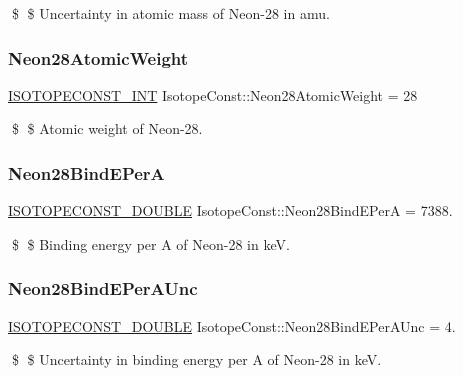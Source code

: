\$ \$ Uncertainty in atomic mass of Neon-\/28 in amu. \mbox{\label{group___isotope_const-_neon-_ne28_gaad970d7aacebccf54f007c617857c7b3}} 
\subsubsection{\texorpdfstring{Neon28\+Atomic\+Weight}{Neon28AtomicWeight}}
{\footnotesize\ttfamily \mbox{\hyperlink{group___isotope_const-_macros_ga5f18360b3e99483a35c32d789e62621c}{I\+S\+O\+T\+O\+P\+E\+C\+O\+N\+S\+T\+\_\+\+I\+NT}} Isotope\+Const\+::\+Neon28\+Atomic\+Weight = 28}

\$ \$ Atomic weight of Neon-\/28. \mbox{\label{group___isotope_const-_neon-_ne28_ga7e28fded1e84296d45d0d99a56a5345b}} 
\subsubsection{\texorpdfstring{Neon28\+Bind\+E\+PerA}{Neon28BindEPerA}}
{\footnotesize\ttfamily \mbox{\hyperlink{group___isotope_const-_macros_ga8f45a7272ce02c0b4c65c44636ed719a}{I\+S\+O\+T\+O\+P\+E\+C\+O\+N\+S\+T\+\_\+\+D\+O\+U\+B\+LE}} Isotope\+Const\+::\+Neon28\+Bind\+E\+PerA = 7388.}

\$ \$ Binding energy per A of Neon-\/28 in keV. \mbox{\label{group___isotope_const-_neon-_ne28_gac0edaf01ca73ef2cca6b67115d2481c7}} 
\subsubsection{\texorpdfstring{Neon28\+Bind\+E\+Per\+A\+Unc}{Neon28BindEPerAUnc}}
{\footnotesize\ttfamily \mbox{\hyperlink{group___isotope_const-_macros_ga8f45a7272ce02c0b4c65c44636ed719a}{I\+S\+O\+T\+O\+P\+E\+C\+O\+N\+S\+T\+\_\+\+D\+O\+U\+B\+LE}} Isotope\+Const\+::\+Neon28\+Bind\+E\+Per\+A\+Unc = 4.}

\$ \$ Uncertainty in binding energy per A of Neon-\/28 in keV. \mbox{\label{group___isotope_const-_neon-_ne28_gae48c7c877b91c389b2ee54119d49dc2e}} 
